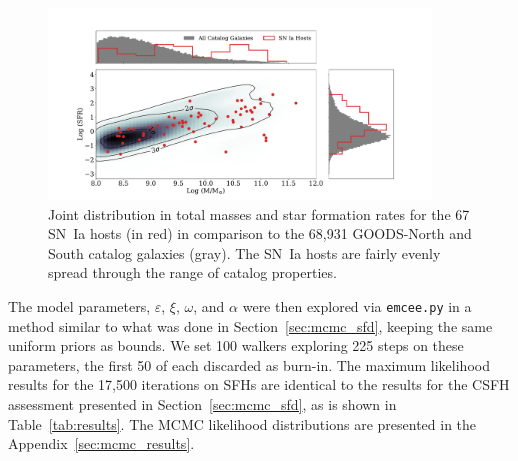 \documentclass[apj, twocolumn]{aastex62}
\begin{document}
\begin{figure}[t] %
   \centering
   \includegraphics[width=4in]{figure_contours.pdf} 
   \caption{\footnotesize {Joint distribution in total masses and star formation rates for the 67 SN~Ia hosts (in red) in comparison to the 68,931 GOODS-North and South catalog galaxies (gray). The SN~Ia hosts are fairly evenly spread through the range of catalog properties.}}
   \label{fig:figure_cdfs}
\end{figure}

{The model parameters, $\varepsilon$, $\xi$, $\omega$, and $\alpha$ were then explored via {\tt emcee.py} in a method similar to what was done in Section~\ref{sec:mcmc_sfd}, keeping the same uniform priors as bounds. We set 100 walkers exploring 225 steps on these parameters, the first 50 of each discarded as burn-in. The maximum likelihood results for the 17,500 iterations on SFHs are identical to the results for the CSFH assessment presented in Section~\ref{sec:mcmc_sfd}, as is shown in Table~\ref{tab:results}. The MCMC likelihood distributions are presented in the Appendix~\ref{sec:mcmc_results}.}
\end{document}
